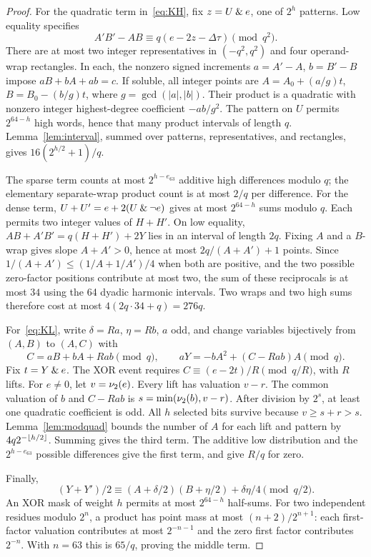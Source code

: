 \begin{proof}
For the quadratic term in~\eqref{eq:KH}, fix $z=U\mathbin{\&} e$, one of $2^h$ patterns. Low equality specifies
\[
 A'B'-AB\equiv q(e-2z-\Delta\tau)\pmod{q^2}.
\]
There are at most two integer representatives in $(-q^2,q^2)$ and four operand-wrap rectangles. In each, the nonzero signed increments $a=A'-A$, $b=B'-B$ impose $aB+bA+ab=c$. If soluble, all integer points are
$A=A_0+(a/g)t$, $B=B_0-(b/g)t$, where $g=\gcd(|a|,|b|)$.
Their product is a quadratic with nonzero integer highest-degree coefficient $-ab/g^2$. The pattern on $U$ permits $2^{64-h}$ high words, hence that many product intervals of length $q$. Lemma~\ref{lem:interval}, summed over patterns, representatives, and rectangles, gives $16(2^{h/2}+1)/q$.

The sparse term counts at most $2^{h-e_{63}}$ additive high differences modulo $q$; the elementary separate-wrap product count is at most $2/q$ per difference. For the dense term, $U+U'=e+2(U\mathbin{\&}\neg e)$ gives at most $2^{64-h}$ sums modulo $q$. Each permits two integer values of $H+H'$. On low equality, $AB+A'B'=q(H+H')+2Y$ lies in an interval of length $2q$. Fixing $A$ and a $B$-wrap gives slope $A+A'>0$, hence at most $2q/(A+A')+1$ points. Since
$1/(A+A')\le(1/A+1/A')/4$ when both are positive, and the two possible zero-factor positions contribute at most two, the sum of these reciprocals is at most $34$ using the 64 dyadic harmonic intervals. Two wraps and two high sums therefore cost at most $4(2q\cdot34+q)=276q$.

For~\eqref{eq:KL}, write $\delta=Ra$, $\eta=Rb$, $a$ odd, and change variables bijectively from $(A,B)$ to $(A,C)$ with
\begin{equation}\label{eq:modchange}
 C=aB+bA+Rab\pmod q,\qquad aY=-bA^2+(C-Rab)A\pmod q.
\end{equation}
Fix $t=Y\mathbin{\&} e$. The XOR event requires $C\equiv(e-2t)/R\pmod{q/R}$, with $R$ lifts. For $e\ne0$, let $v=\nu_2(e)$. Every lift has valuation $v-r$. The common valuation of $b$ and $C-Rab$ is $s=\min(\nu_2(b),v-r)$. After division by $2^s$, at least one quadratic coefficient is odd. All $h$ selected bits survive because $v\ge s+r>s$. Lemma~\ref{lem:modquad} bounds the number of $A$ for each lift and pattern by $4q2^{-\left\lfloor h/2\right\rfloor}$. Summing gives the third term. The additive low distribution and the $2^{h-e_{63}}$ possible differences give the first term, and give $R/q$ for zero.

Finally,
\[
 (Y+Y')/2\equiv(A+\delta/2)(B+\eta/2)+\delta\eta/4\pmod{q/2}.
\]
An XOR mask of weight $h$ permits at most $2^{64-h}$ half-sums. For two independent residues modulo $2^n$, a product has point mass at most $(n+2)/2^{n+1}$: each first-factor valuation contributes at most $2^{-n-1}$ and the zero first factor contributes $2^{-n}$. With $n=63$ this is $65/q$, proving the middle term.
\end{proof}

